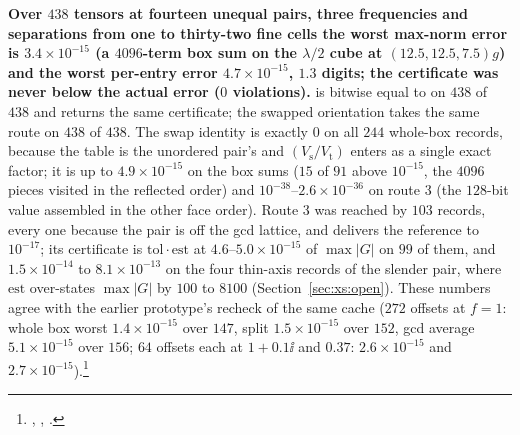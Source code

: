 \noindent
\textbf{Over $438$ tensors at fourteen unequal pairs, three frequencies and separations from
one to thirty-two fine cells the worst max-norm error is $3.4\times10^{-15}$ (a
$4096$-term box sum on the $\lambda/2$ cube at $(12.5,12.5,7.5)g$) and the worst per-entry
error $4.7\times10^{-15}$, $1.3$ digits; the certificate was never below the actual error
($0$ violations).}  is bitwise equal to  on $438$ of
$438$ and returns the same certificate; the swapped orientation takes the same route on
$438$ of $438$. The swap identity is exactly $0$ on all $244$ whole-box records, because
the table is the unordered pair's and $(V_{\mathrm{s}}/V_{\mathrm{t}})$ enters as a single
exact factor; it is up to $4.9\times10^{-15}$ on the box sums ($15$ of $91$ above
$10^{-15}$, the $4096$ pieces visited in the reflected order) and $10^{-38}$--$2.6\times10^{-36}$
on route 3 (the $128$-bit value assembled in the other face order). Route 3 was reached by
$103$ records, every one because the pair is off the gcd lattice, and delivers the
reference to $10^{-17}$; its certificate is $\mathrm{tol}\cdot\mathrm{est}$ at
$4.6$--$5.0\times10^{-15}$ of $\max|G|$ on $99$ of them, and $1.5\times10^{-14}$ to
$8.1\times10^{-13}$ on the four thin-axis records of the slender pair, where $\mathrm{est}$
over-states $\max|G|$ by $100$ to $8100$ (Section~\ref{sec:xs:open}). These numbers agree
with the earlier prototype's recheck of the same cache ($272$ offsets at $f = 1$: whole box
worst $1.4\times10^{-15}$ over $147$, split $1.5\times10^{-15}$ over $152$, gcd average
$5.1\times10^{-15}$ over $156$; $64$ offsets each at $1+0.1\ii$ and $0.37$: $2.6\times10^{-15}$
and $2.7\times10^{-15}$).\footnote{,
, .}

